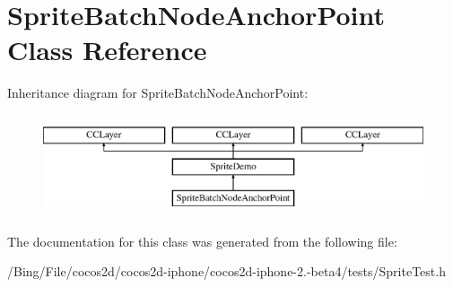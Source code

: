 \hypertarget{interface_sprite_batch_node_anchor_point}{\section{Sprite\-Batch\-Node\-Anchor\-Point Class Reference}
\label{interface_sprite_batch_node_anchor_point}
}
Inheritance diagram for Sprite\-Batch\-Node\-Anchor\-Point\-:\begin{figure}[H]
\begin{center}
\leavevmode
\includegraphics[height=3.000000cm]{interface_sprite_batch_node_anchor_point}
\end{center}
\end{figure}


The documentation for this class was generated from the following file\-:\begin{DoxyCompactItemize}
\item 
/\-Bing/\-File/cocos2d/cocos2d-\/iphone/cocos2d-\/iphone-\/2.-\/beta4/tests/Sprite\-Test.\-h\end{DoxyCompactItemize}
